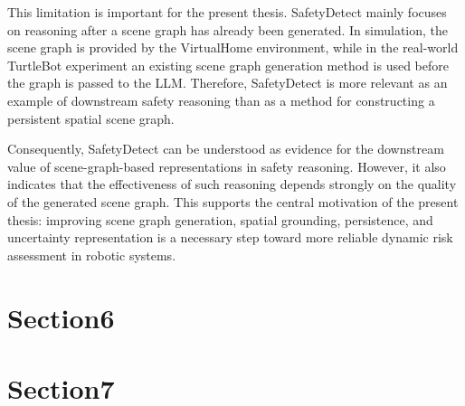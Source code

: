 {This limitation is important for the present thesis. SafetyDetect mainly focuses on reasoning after a scene graph has already been generated. In simulation, the scene graph is provided by the VirtualHome environment, while in the real-world TurtleBot experiment an existing scene graph generation method is used before the graph is passed to the LLM. Therefore, SafetyDetect is more relevant as an example of downstream safety reasoning than as a method for constructing a persistent spatial scene graph.

Consequently, SafetyDetect can be understood as evidence for the downstream value of scene-graph-based representations in safety reasoning. However, it also indicates that the effectiveness of such reasoning depends strongly on the quality of the generated scene graph. This supports the central motivation of the present thesis: improving scene graph generation, spatial grounding, persistence, and uncertainty representation is a necessary step toward more reliable dynamic risk assessment in robotic systems.
}







\section{Section6}
\small{


}
\section{Section7}
\small{


}